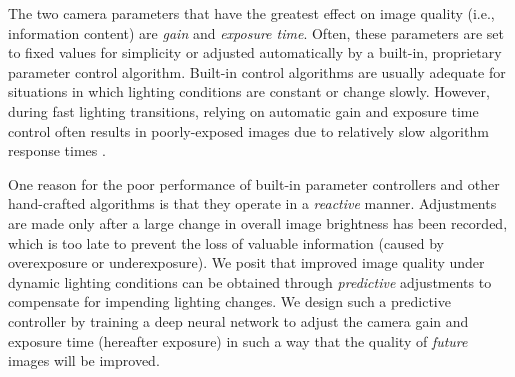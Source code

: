 \documentclass[letterpaper, 10pt, journal, twoside]{IEEEtran}
\begin{document}
The two camera parameters that have the greatest effect on image quality (i.e., information content) are \textit{gain} and \textit{exposure time}. 
Often, these parameters are set to fixed values for simplicity or adjusted automatically by a built-in, proprietary parameter control algorithm. 
Built-in control algorithms are usually adequate for situations in which lighting conditions are constant or change slowly. 
However, during fast lighting transitions, relying on automatic gain and exposure time control often results in poorly-exposed images due to relatively slow algorithm response times \cite{Shim2014}.

One reason for the poor performance of built-in parameter controllers and other hand-crafted algorithms is that they operate in a \emph{reactive} manner.
Adjustments are made only after a large change in overall image brightness has been recorded, which is too late to prevent the loss of valuable information (caused by overexposure or underexposure).
We posit that improved image quality under dynamic lighting conditions can be obtained through \textit{predictive} adjustments to compensate for impending lighting changes. We design such a predictive controller by training a deep neural network to adjust the camera gain and exposure time (hereafter exposure) in such a way that the quality of \textit{future} images will be improved.
\end{document}
